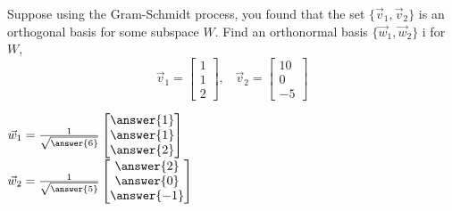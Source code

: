 \documentclass{ximera}
\begin{document}
  	  		              \begin{question} 
  	  		              Suppose using the Gram-Schmidt process, you found that the set $\{\vec{v}_1,\vec{v}_2\}$ is an orthogonal basis for some subspace $W$. Find an orthonormal basis $\{\vec{w}_1,\vec{w}_2\}$ i for $W$,
  	  		              	$$\vec{v}_1 = \begin{bmatrix} 1\\1\\2\end{bmatrix}, \hspace{10pt} \vec{v}_2 = \begin{bmatrix} 10\\0\\-5\end{bmatrix}$$
  	  		              	
  	  		              	$\vec{w}_1 = \frac{1}{\sqrt{\answer{6}}}\begin{bmatrix} \answer{1}\\\answer{1}\\\answer{2}\end{bmatrix}$\vspace{10pt}\\
  	  		              	$\vec{w}_2 = \frac{1}{\sqrt{\answer{5}}}\begin{bmatrix} \answer{2}\\\answer{0}\\\answer{-1}\end{bmatrix}$\vspace{10pt}\\
  	  		              
  	  		              \end{question}
\end{document}
